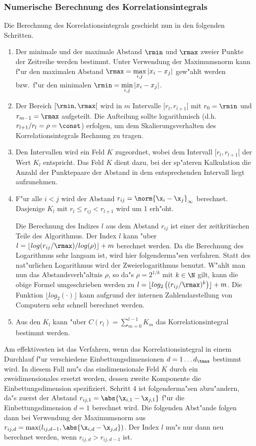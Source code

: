\subsubsection{Numerische Berechnung des Korrelationsintegrals}
Die Berechnung des Korrelationsintegrals geschieht nun in den folgenden Schritten.
\begin{enumerate}
\item Der minimale und der maximale Abstand $\rmin$ und $\rmax$ zweier Punkte der
Zeitreihe werden bestimmt. Unter Verwendung der Maximumsnorm kann f"ur den maximalen
Abstand $\rmax=\max\limits_{i,j}{\lvert x_i-x_j \rvert}$ gew"ahlt werden bzw.\ f"ur den
minimalen $\rmin=\min\limits_{i,j}{\lvert x_i-x_j \rvert}$. 
\item Der Bereich $[\rmin,\rmax[$ wird in $m$ Intervalle $[r_l,r_{l+1}[$ mit
$r_0=\rmin$ und $r_{m-1}=\rmax$ aufgeteilt. Die Aufteilung sollte logarithmisch (d.h.\
$r_{l+1}/r_l=\rho=\const$) erfolgen, um dem Skalierungsverhalten des Korrelationsintegrals
Rechnung zu tragen.
\item Den Intervallen wird ein Feld $K$ zugeordnet, wobei dem Intervall $[r_l,r_{l+1}[$
der Wert $K_l$ entspricht. Das Feld $K$ dient dazu, bei der sp"ateren Kalkulation die
Anzahl der Punktepaare der Abstand in dem entsprechenden Intervall liegt aufzunehmen.
\item F"ur alle $i<j$ wird der Abstand $r_{ij}=\norm{\x_i-\x_j}_\infty$
berechnet. Dasjenige $K_l$ mit $r_l\leq r_{ij}\lt r_{l+1}$ wird um 1 erh"oht.

Die Berechnung des Indizes $l$ aus dem Abstand $r_{ij}$ ist einer der zeitkritischen Teile 
des Algorithmus. Der Index $l$ kann "uber $l=\lfloor log(r_{ij} / \rmax ) / log(\rho)
\rfloor + m$ berechnet werden. Da die Berechnung des Logarithmus sehr langsam ist, wird
hier folgenderma"sen verfahren. Statt des nat"urlichen Logarithmus wird der
Zweierlogarithmus benutzt. W"ahlt man nun das Abstandsverh"altnis $\rho$, so da"s
$\rho=2^{1/k}$ mit $k\in\N$ gilt, kann die obige Formel umgeschrieben werden zu $l=\lfloor
log_2\left( (r_{ij} / \rmax )^k \right) \rfloor + m$. Die Funktion $\lfloor
log_2(\cdot) \rfloor$ kann aufgrund der internen Zahlendarstellung von Computern sehr
schnell berechnet werden.
\item Aus den $K_l$ kann "uber $C(r_l)=\sum\limits_{m=0}^{l-1} K_m$ das Korrelationsintegral bestimmt
werden. 
\end{enumerate}
Am effektivesten ist das Verfahren, wenn das Korrelationsintegral in einem Durchlauf f"ur verschiedene 
Einbettungsdimensionen $d=1\dots d_\tmax$ bestimmt wird. In diesem Fall mu"s das
eindimensionale Feld $K$ durch ein zweidimensionales ersetzt werden, dessen zweite
Komponente die Einbettungsdimension spezifiziert. Schritt 4 ist folgenderma"sen
abzu"andern, da"s zuerst der Abstand $r_{ij,1}=\abs{\x_{i,1}-\x_{j,1}}$ f"ur die
Einbettungsdimension $d=1$ berechnet wird. Die folgenden Abst"ande folgen dann bei Verwendung
der Maximumsnorm aus $r_{ij,d}=\max(l_{ij,d-1},\abs{\x_{i,d}-\x_{j,d}})$. Der Index $l$
mu"s nur dann neu berechnet werden, wenn $r_{ij,d}\gt r_{ij,d-1}$ ist.

